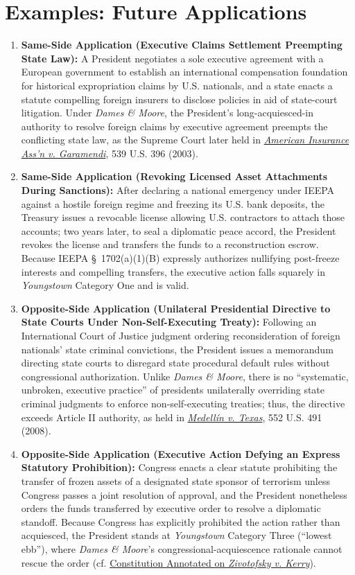 \documentclass[12pt]{article}
\begin{document}
\section{Examples: Future Applications}
\begin{enumerate}
  \item \textbf{Same-Side Application (Executive Claims Settlement Preempting State Law):} A President negotiates a sole executive agreement with a European government to establish an international compensation foundation for historical expropriation claims by U.S. nationals, and a state enacts a statute compelling foreign insurers to disclose policies in aid of state-court litigation. Under \textit{Dames \& Moore}, the President's long-acquiesced-in authority to resolve foreign claims by executive agreement preempts the conflicting state law, as the Supreme Court later held in \href{https://supreme.justia.com/cases/federal/us/539/396/}{\textit{American Insurance Ass'n v. Garamendi}}, 539 U.S. 396 (2003).
  \item \textbf{Same-Side Application (Revoking Licensed Asset Attachments During Sanctions):} After declaring a national emergency under IEEPA against a hostile foreign regime and freezing its U.S. bank deposits, the Treasury issues a revocable license allowing U.S. contractors to attach those accounts; two years later, to seal a diplomatic peace accord, the President revokes the license and transfers the funds to a reconstruction escrow. Because IEEPA \S\ 1702(a)(1)(B) expressly authorizes nullifying post-freeze interests and compelling transfers, the executive action falls squarely in \textit{Youngstown} Category One and is valid.
  \item \textbf{Opposite-Side Application (Unilateral Presidential Directive to State Courts Under Non-Self-Executing Treaty):} Following an International Court of Justice judgment ordering reconsideration of foreign nationals' state criminal convictions, the President issues a memorandum directing state courts to disregard state procedural default rules without congressional authorization. Unlike \textit{Dames \& Moore}, there is no ``systematic, unbroken, executive practice'' of presidents unilaterally overriding state criminal judgments to enforce non-self-executing treaties; thus, the directive exceeds Article II authority, as held in \href{https://supreme.justia.com/cases/federal/us/552/491/}{\textit{Medell\'in v. Texas}}, 552 U.S. 491 (2008).
  \item \textbf{Opposite-Side Application (Executive Action Defying an Express Statutory Prohibition):} Congress enacts a clear statute prohibiting the transfer of frozen assets of a designated state sponsor of terrorism unless Congress passes a joint resolution of approval, and the President nonetheless orders the funds transferred by executive order to resolve a diplomatic standoff. Because Congress has explicitly prohibited the action rather than acquiesced, the President stands at \textit{Youngstown} Category Three (``lowest ebb''), where \textit{Dames \& Moore}'s congressional-acquiescence rationale cannot rescue the order (cf. \href{https://constitution.congress.gov/browse/essay/artII-S1-C1-8/ALDE_00013797/}{Constitution Annotated on \textit{Zivotofsky v. Kerry}}).

\end{enumerate}
\end{document}
